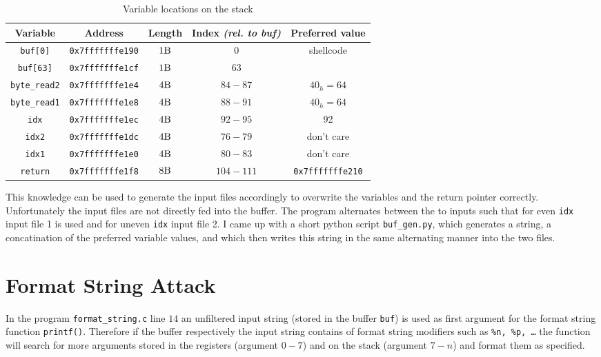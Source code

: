 \documentclass[12pt]{article}
\begin{document}
\begin{table}[H]
	\begin{tabular}{c|cccc}
		\textbf{Variable} & \textbf{Address} & \textbf{Length} & \textbf{Index \textit{(rel. to buf)}} & \textbf{Preferred value} \\
		\hline
		\texttt{buf[0]} & \texttt{0x7fffffffe190} & $1\si{\byte}$ & $0$ & \multirow{2}{*}{shellcode}\\
		\texttt{buf[63]} & \texttt{0x7fffffffe1cf} & $1\si{\byte}$ & $63$ & \\
		\texttt{byte\_read2} & \texttt{0x7fffffffe1e4} & $4\si{\byte}$ & $84-87$ &$40_h = 64$ \\
		\texttt{byte\_read1} & \texttt{0x7fffffffe1e8} & $4\si{\byte}$ & $88-91$ &$40_h = 64$ \\
		\texttt{idx} & \texttt{0x7fffffffe1ec} & $4\si{\byte}$ & $92-95$ & 92\\
		\texttt{idx2} & \texttt{0x7fffffffe1dc} & $4\si{\byte}$ & $76-79$ & don't care\\
		\texttt{idx1} & \texttt{0x7fffffffe1e0} & $4\si{\byte}$ & $80-83$ & don't care\\
		\texttt{return} & \texttt{0x7fffffffe1f8} & $8\si{\byte}$ & $104-111$ & \texttt{0x7fffffffe210} \\
	\end{tabular}
	\caption{Variable locations on the stack}
	\label{stack}
\end{table}

This knowledge can be used to generate the input files accordingly to overwrite the variables and the return pointer correctly. 
Unfortunately the input files are not directly fed into the buffer. The program alternates between the to inputs such that for even \texttt{idx} input file 1 is used and for uneven \texttt{idx} input file 2.
I came up with a short python script \texttt{buf\_gen.py}, which generates a string, a concatination of the preferred variable values, and which then writes this string in the same alternating manner into the two files.



\newpage
\section{Format String Attack}
In the program \texttt{format\_string.c} line $14$ an unfiltered input string (stored in the buffer \texttt{buf}) is used as first argument for the format string function \texttt{printf()}.
Therefore if the buffer respectively the input string contains of format string modifiers such as \texttt{\%n, \%p, \dots} the function will search for more arguments stored in the registers (argument $0-7$) and on the stack (argument $7-n$) and format them as specified. 
\end{document}

